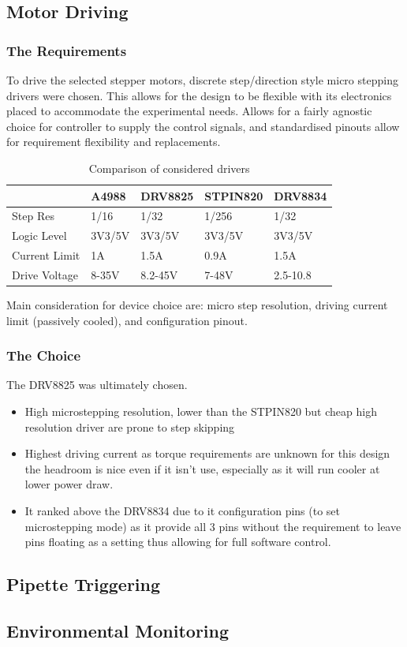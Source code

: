 \subsection{Motor Driving}

\subsubsection*{The Requirements}
To drive the selected stepper motors, discrete step/direction style micro stepping drivers were chosen. This allows for the design to be flexible with its electronics placed to accommodate the experimental needs. Allows for a fairly agnostic choice for controller to supply the control signals, and standardised pinouts allow for requirement flexibility and replacements.

\begin{table}[h]
    \centering
    \begin{tabular}{|l|l|l|l|l|}
        \hline
        \textbf{}     & \textbf{A4988} & \textbf{DRV8825} & \textbf{STPIN820} & \textbf{DRV8834} \\ \hline
        Step Res      & 1/16           & 1/32             & 1/256             & 1/32             \\ \hline
        Logic Level   & 3V3/5V         & 3V3/5V           & 3V3/5V            & 3V3/5V           \\ \hline
        Current Limit & 1A             & 1.5A             & 0.9A              & 1.5A             \\ \hline
        Drive Voltage & 8-35V          & 8.2-45V          & 7-48V             & 2.5-10.8         \\ \hline
    \end{tabular}
    \caption{Comparison of considered drivers}
\end{table}

Main consideration for device choice are: micro step resolution, driving current limit (passively cooled), and configuration pinout.

\subsubsection*{The Choice}
The DRV8825 was ultimately chosen.
\begin{itemize}
    \item High microstepping resolution, lower than the STPIN820 but cheap high resolution driver are prone to step skipping \cite{step_book}
    \item Highest driving current as torque requirements are unknown for this design the headroom is nice even if it isn't use, especially as it will run cooler at lower power draw.
    \item It ranked above the DRV8834 due to it configuration pins (to set microstepping mode) as it provide all 3 pins without the requirement to leave pins floating as a setting thus allowing for full software control.
\end{itemize}

\subsection{Pipette Triggering}

\subsection{Environmental Monitoring}
